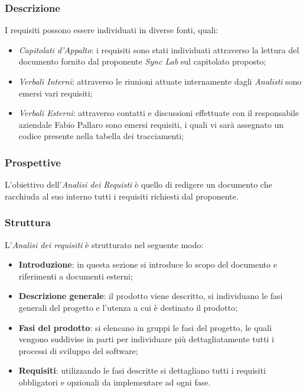 \subsubsection{Descrizione}\label{2.2.3.1.2}
I requisiti possono essere individuati in diverse fonti, quali:
\begin{itemize}
	\item \textit{Capitolati d'Appalto}: i requisiti sono stati individuati attraverso la lettura del documento fornito dal proponente \textit{Sync Lab} sul capitolato proposto;
	\item \textit{Verbali Interni}: attraverso le riunioni attuate internamente dagli \textit{Analisti} sono emersi vari requisiti;
	\item \textit{Verbali Esterni}: attraverso contatti e discussioni effettuate con il responsabile aziendale Fabio Pallaro sono emersi requisiti, i quali vi sarà assegnato un codice presente nella tabella dei tracciamenti;
\end{itemize}
\subsubsection{Prospettive}\label{2.2.3.1.3}
L'obiettivo dell'\textit{Analisi dei Requisti} è quello di redigere un documento che racchiuda al suo interno tutti i requisiti richiesti dal proponente.
\subsubsection{Struttura}\label{2.2.3.1.4} %
L'\textit{Analisi dei requisiti} è strutturato nel seguente modo:
\begin{itemize}
	\item \textbf{Introduzione}: in questa sezione si introduce lo scopo del documento e riferimenti a documenti esterni;
	\item \textbf{Descrizione generale}: il prodotto viene descritto, si individuano le fasi generali del progetto e l'utenza a cui è destinato il prodotto;
	\item \textbf{Fasi del prodotto}: si elencano in gruppi le fasi del progetto, le quali vengono suddivise in parti per individuare più dettagliatamente tutti i processi di sviluppo del software;
	\item \textbf{Requisiti}: utilizzando le fasi descritte si dettagliano tutti i requisiti obbligatori e opzionali da implementare ad ogni fase.
\end{itemize}
